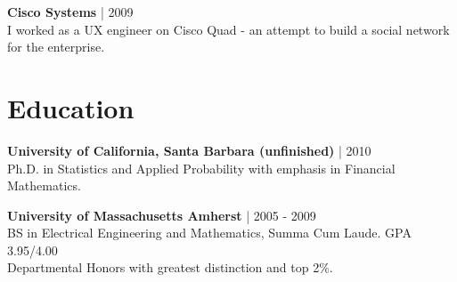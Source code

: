\documentclass[a4paper,10pt]{article}
\begin{document}
\vspace{5pt} %

\noindent
\textbf{Cisco Systems} | 2009 \\
I worked as a UX engineer on Cisco Quad - an attempt to build a social network for the enterprise.

\section*{Education}

\noindent
\textbf{University of California, Santa Barbara (unfinished)} | 2010 \\
Ph.D. in Statistics and Applied Probability with emphasis in Financial Mathematics.

\vspace{5pt} %

\noindent
\textbf{University of Massachusetts Amherst} | 2005 - 2009 \\
BS in Electrical Engineering and Mathematics, Summa Cum Laude. GPA 3.95/4.00 \\
Departmental Honors with greatest distinction and top 2\%.
\end{document}
